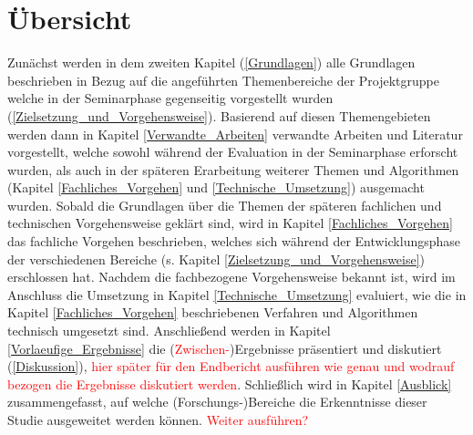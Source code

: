 \section{Übersicht}

Zunächst werden in dem zweiten Kapitel (\ref{Grundlagen}) alle Grundlagen beschrieben in Bezug auf die angeführten Themenbereiche der Projektgruppe welche in der Seminarphase gegenseitig vorgestellt wurden (\ref{Zielsetzung_und_Vorgehensweise}). Basierend auf diesen Themengebieten werden dann in Kapitel \ref{Verwandte_Arbeiten} verwandte Arbeiten und Literatur vorgestellt, welche sowohl während der Evaluation in der Seminarphase erforscht wurden, als auch in der späteren Erarbeitung weiterer Themen und Algorithmen (Kapitel \ref{Fachliches_Vorgehen} und \ref{Technische_Umsetzung}) ausgemacht wurden. Sobald die Grundlagen über die Themen der späteren fachlichen und technischen Vorgehensweise geklärt sind, wird in Kapitel \ref{Fachliches_Vorgehen} das fachliche Vorgehen beschrieben, welches sich während der Entwicklungsphase der verschiedenen Bereiche (s. Kapitel \ref{Zielsetzung_und_Vorgehensweise}) erschlossen hat. Nachdem die fachbezogene Vorgehensweise bekannt ist, wird im Anschluss die Umsetzung in Kapitel \ref{Technische_Umsetzung} evaluiert, wie die in Kapitel \ref{Fachliches_Vorgehen} beschriebenen Verfahren und Algorithmen technisch umgesetzt sind. Anschließend werden in Kapitel \ref{Vorlaeufige_Ergebnisse} die (\textcolor{red}{Zwischen-})Ergebnisse präsentiert und diskutiert (\ref{Diskussion}), \textcolor{red}{hier später für den Endbericht ausführen wie genau und wodrauf bezogen die Ergebnisse diskutiert werden}. Schließlich wird in Kapitel \ref{Ausblick} zusammengefasst, auf welche (Forschungs-)Bereiche die Erkenntnisse dieser Studie ausgeweitet werden können. \textcolor{red}{Weiter ausführen?}
